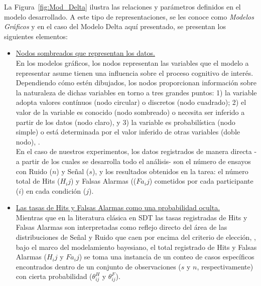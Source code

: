 La Figura~\ref{fig:Mod_Delta} ilustra las relaciones y parámetros definidos en el modelo desarrollado. A este tipo de representaciones, se les conoce como \textit{Modelos Gráficos} y en el caso del Modelo Delta aquí presentado, se presentan los siguientes elementos:\\

\begin{itemize}
\item \underline{Nodos sombreados que representan los datos.}\\

En los modelos gráficos, los nodos representan las variables que el modelo a representar asume tienen una influencia sobre el proceso cognitivo de interés. Dependiendo cómo estén dibujados, los nodos proporcionan información sobre la naturaleza de dichas variables en torno a tres grandes puntos: 1) la variable adopta valores contínuos (nodo circular) o discretos (nodo cuadrado); 2) el valor de la variable es conocido (nodo sombreado) o necesita ser inferido a partir de los datos (nodo claro), y 3) la variable es probabilística (nodo simple) o está determinada por el valor inferido de otras variables (doble nodo), \parencite{LeeBook}.\\

En el caso de nuestros experimentos, los datos registrados de manera directa -a partir de los cuales se desarrolla todo el análisis- son el número de ensayos con Ruido ($n$) y Señal ($s$), y los resultados obtenidos en la tarea: el número total de Hits ($H_ij$) y Falsas Alarmas (($Fa_ij$) cometidos por cada participante ($i$) en cada condición ($j$).\\

\item \underline{Las tasas de Hits y Falsas Alarmas como una probabilidad oculta.}\\ 

Mientras que en la literatura clásica en SDT las tasas registradas de Hits y Falsas Alarmas son interpretadas como reflejo directo del área de las distribuciones de Señal y Ruido que caen por encima del criterio de elección, \parencite{Wickens, Gescheider, Stainslaw1999}, bajo el marco del modelamiento bayesiano, el total registrado de Hits y Falsas Alarmas ($H_ij$ y $Fa_ij$) se toma una instancia de un conteo de casos específicos encontrados dentro de un conjunto de observaciones ($s$ y $n$, respectivamente) con cierta probabilidad ($\theta^H_{ij}$ y $\theta^F_{ij}$).\\


\end{itemize}
